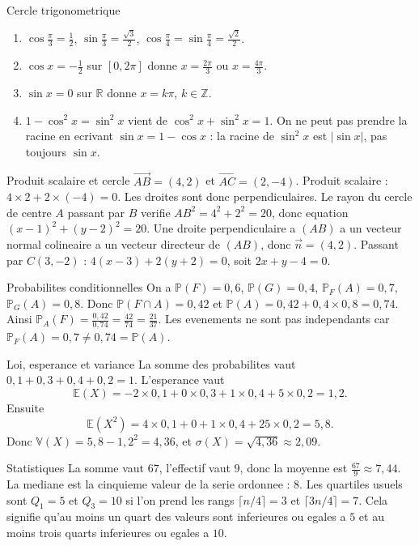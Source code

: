 \documentclass[11pt,a4paper]{article}
\newcommand{\R}{\mathbb{R}}
\newcommand{\E}{\mathbb{E}}
\newcommand{\V}{\mathbb{V}}
\newcommand{\Pp}{\mathbb{P}}
\newcommand{\vect}[1]{\overrightarrow{#1}}
\begin{document}
\begin{corrbox}{Cercle trigonometrique}
\begin{enumerate}
  \item $\cos\frac\pi3=\frac12$, $\sin\frac\pi3=\frac{\sqrt3}{2}$, $\cos\frac\pi4=\sin\frac\pi4=\frac{\sqrt2}{2}$.
  \item $\cos x=-\frac12$ sur $[0,2\pi]$ donne $x=\frac{2\pi}3$ ou $x=\frac{4\pi}3$.
  \item $\sin x=0$ sur $\R$ donne $x=k\pi$, $k\in\mathbb Z$.
  \item $1-\cos^2x=\sin^2x$ vient de $\cos^2x+\sin^2x=1$. On ne peut pas prendre la racine en ecrivant $\sin x=1-\cos x$ : la racine de $\sin^2x$ est $|\sin x|$, pas toujours $\sin x$.
\end{enumerate}
\end{corrbox}

\begin{corrbox}{Produit scalaire et cercle}
$\vect{AB}=(4,2)$ et $\vect{AC}=(2,-4)$. Produit scalaire : $4\times2+2\times(-4)=0$. Les droites sont donc perpendiculaires. Le rayon du cercle de centre $A$ passant par $B$ verifie $AB^2=4^2+2^2=20$, donc equation $(x-1)^2+(y-2)^2=20$. Une droite perpendiculaire a $(AB)$ a un vecteur normal colineaire a un vecteur directeur de $(AB)$, donc $\vec n=(4,2)$. Passant par $C(3,-2)$ : $4(x-3)+2(y+2)=0$, soit $2x+y-4=0$.
\end{corrbox}

\begin{corrbox}{Probabilites conditionnelles}
On a $\Pp(F)=0,6$, $\Pp(G)=0,4$, $\Pp_F(A)=0,7$, $\Pp_G(A)=0,8$. Donc $\Pp(F\cap A)=0,42$ et $\Pp(A)=0,42+0,4\times0,8=0,74$. Ainsi $\Pp_A(F)=\frac{0,42}{0,74}=\frac{42}{74}=\frac{21}{37}$. Les evenements ne sont pas independants car $\Pp_F(A)=0,7\ne0,74=\Pp(A)$.
\end{corrbox}

\begin{corrbox}{Loi, esperance et variance}
La somme des probabilites vaut $0,1+0,3+0,4+0,2=1$. L'esperance vaut
\[
\E(X)=-2\times0,1+0\times0,3+1\times0,4+5\times0,2=1,2.
\]
Ensuite
\[
\E(X^2)=4\times0,1+0+1\times0,4+25\times0,2=5,8.
\]
Donc $\V(X)=5,8-1,2^2=4,36$, et $\sigma(X)=\sqrt{4,36}\approx2,09$.
\end{corrbox}

\begin{corrbox}{Statistiques}
La somme vaut $67$, l'effectif vaut $9$, donc la moyenne est $\frac{67}{9}\approx7,44$. La mediane est la cinquieme valeur de la serie ordonnee : $8$. Les quartiles usuels sont $Q_1=5$ et $Q_3=10$ si l'on prend les rangs $\lceil n/4\rceil=3$ et $\lceil3n/4\rceil=7$. Cela signifie qu'au moins un quart des valeurs sont inferieures ou egales a $5$ et au moins trois quarts inferieures ou egales a $10$.
\end{corrbox}
\end{document}
